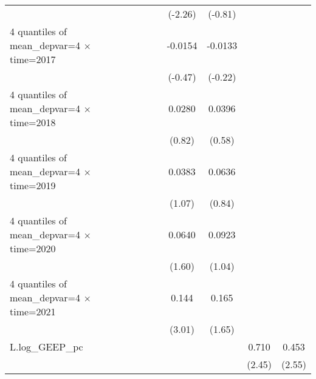 \begin{table}[htbp]
\begin{tabular}{l*{6}{c}}
                    &                     &                     &     (-2.26)         &     (-0.81)         &                     &                     \\
[1em]
4 quantiles of mean\_depvar=4 $\times$ time=2017&                     &                     &     -0.0154         &     -0.0133         &                     &                     \\
                    &                     &                     &     (-0.47)         &     (-0.22)         &                     &                     \\
[1em]
4 quantiles of mean\_depvar=4 $\times$ time=2018&                     &                     &      0.0280         &      0.0396         &                     &                     \\
                    &                     &                     &      (0.82)         &      (0.58)         &                     &                     \\
[1em]
4 quantiles of mean\_depvar=4 $\times$ time=2019&                     &                     &      0.0383         &      0.0636         &                     &                     \\
                    &                     &                     &      (1.07)         &      (0.84)         &                     &                     \\
[1em]
4 quantiles of mean\_depvar=4 $\times$ time=2020&                     &                     &      0.0640         &      0.0923         &                     &                     \\
                    &                     &                     &      (1.60)         &      (1.04)         &                     &                     \\
[1em]
4 quantiles of mean\_depvar=4 $\times$ time=2021&                     &                     &       0.144\sym{***}&       0.165         &                     &                     \\
                    &                     &                     &      (3.01)         &      (1.65)         &                     &                     \\
[1em]
L.log\_GEEP\_pc       &                     &                     &                     &                     &       0.710\sym{**} &       0.453\sym{**} \\
                    &                     &                     &                     &                     &      (2.45)         &      (2.55)         \\

\end{tabular}
\end{table}
